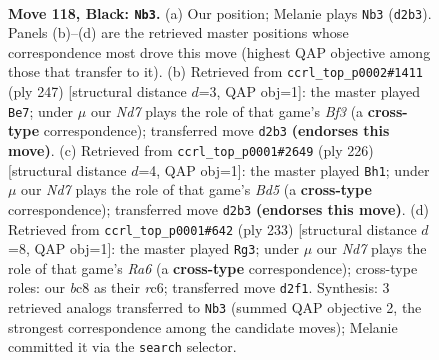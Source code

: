 \documentclass[11pt]{article}
\begin{document}
\clearpage

\begin{figure}[p]\centering
\begin{subfigure}{0.46\textwidth}\centering
\resizebox{\linewidth}{!}{%
\newchessgame
\chessboard[
  setfen={2B5/6k1/8/6PP/8/8/3n2K1/8 b - - 6 118},
  showmover=false,
  pgfstyle=straightmove, color=movearrow, markmove={d2-b3}
]}
\caption{}
\end{subfigure}\hfill
\begin{subfigure}{0.46\textwidth}\centering
\resizebox{\linewidth}{!}{%
\newchessgame
\chessboard[
  setfen={8/8/1k3b2/8/1PP5/8/2K3B1/8 b - - 88 124},
  showmover=false,
  pgfstyle=straightmove, color=movearrow, markmove={f6-e7}
]}
\caption{}
\end{subfigure}
\\[4pt]
\begin{subfigure}{0.46\textwidth}\centering
\resizebox{\linewidth}{!}{%
\newchessgame
\chessboard[
  setfen={8/8/1k3b2/3B4/8/6pp/8/5K2 w - - 68 114},
  showmover=false,
  pgfstyle=straightmove, color=movearrow, markmove={d5-h1}
]}
\caption{}
\end{subfigure}\hfill
\begin{subfigure}{0.46\textwidth}\centering
\resizebox{\linewidth}{!}{%
\newchessgame
\chessboard[
  setfen={8/6k1/2R5/5PP1/7p/r7/5K2/8 b - - 0 117},
  showmover=false,
  pgfstyle=straightmove, color=movearrow, markmove={a3-g3}
]}
\caption{}
\end{subfigure}
\caption{\textbf{Move 118, Black: \texttt{Nb3}.} (a) Our position; Melanie plays \texttt{Nb3} (\texttt{d2b3}). Panels (b)--(d) are the retrieved master positions whose correspondence most drove this move (highest QAP objective among those that transfer to it). (b) Retrieved from \texttt{ccrl\_top\_p0002\#1411} (ply 247) [structural distance $d$=3, QAP obj=1]: the master played \texttt{Be7}; under $\mu$ our \emph{Nd7} plays the role of that game's \emph{Bf3} (a \textbf{cross-type} correspondence); transferred move \texttt{d2b3} \textbf{(endorses this move)}. (c) Retrieved from \texttt{ccrl\_top\_p0001\#2649} (ply 226) [structural distance $d$=4, QAP obj=1]: the master played \texttt{Bh1}; under $\mu$ our \emph{Nd7} plays the role of that game's \emph{Bd5} (a \textbf{cross-type} correspondence); transferred move \texttt{d2b3} \textbf{(endorses this move)}. (d) Retrieved from \texttt{ccrl\_top\_p0001\#642} (ply 233) [structural distance $d$=8, QAP obj=1]: the master played \texttt{Rg3}; under $\mu$ our \emph{Nd7} plays the role of that game's \emph{Ra6} (a \textbf{cross-type} correspondence); cross-type roles: our \emph{b}c8 as their \emph{r}c6; transferred move \texttt{d2f1}. Synthesis: 3 retrieved analogs transferred to \texttt{Nb3} (summed QAP objective 2, the strongest correspondence among the candidate moves); Melanie committed it via the \texttt{search} selector.}
\label{fig:thought-m235}
\end{figure}
\end{document}
